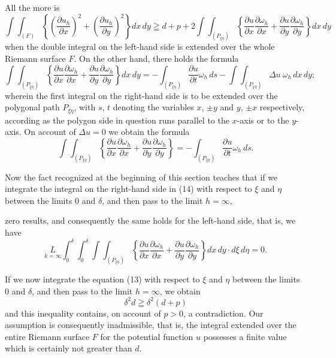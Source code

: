 \documentclass{article}
\begin{document}
All the more is
\[
\tag{13}
\int\!\!\int_{(F)} \left\{ \left(\frac{\partial u_h}{\partial x}\right)^2 + \left(\frac{\partial u_h}{\partial y}\right)^2 \right\} dx\,dy \geqq d + p + 2 \int\!\!\int_{(P_{\xi\eta})} \left\{ \frac{\partial u}{\partial x} \frac{\partial \omega_h}{\partial x} + \frac{\partial u}{\partial y} \frac{\partial \omega_h}{\partial y} \right\} dx\,dy
\]
when the double integral on the left-hand side is extended over the whole Riemann surface $F$. On the other hand, there holds the formula
\[
\int\!\!\int_{(P_{\xi\eta})} \left\{ \frac{\partial u}{\partial x} \frac{\partial \omega_h}{\partial x} + \frac{\partial u}{\partial y} \frac{\partial \omega_h}{\partial y} \right\} dx\,dy = - \int_{(P_{\xi\eta})} \frac{\partial u}{\partial t} \omega_h\,ds - \int\!\!\int_{(P_{\xi\eta})} \Delta u\ \omega_h\,dx\,dy;
\]
wherein the first integral on the right-hand side is to be extended over the polygonal path $P_{\xi\eta}$, with $s$, $t$ denoting the variables $x$, $\pm y$ and $y$, $\pm x$ respectively, according as the polygon side in question runs parallel to the $x$-axis or to the $y$-axis. On account of $\Delta u = 0$ we obtain the formula
\[
\tag{14}
\int\!\!\int_{(P_{\xi\eta})} \left\{ \frac{\partial u}{\partial x} \frac{\partial \omega_h}{\partial x} + \frac{\partial u}{\partial y} \frac{\partial \omega_h}{\partial y} \right\} = - \int_{(P_{\xi\eta})} \frac{\partial u}{\partial t} \omega_h\,ds.
\]

Now the fact recognized at the beginning of this section teaches that if we integrate the integral on the right-hand side in (14) with respect to $\xi$ and $\eta$ between the limits 0 and $\delta$, and then pass to the limit $h = \infty$,

zero results, and consequently the same holds for the left-hand side, that is, we have
\[
\underset{k=\infty}{L} \int_0^\delta \int_0^\delta \int\!\!\int_{(P_{\xi\eta})} \left\{ \frac{\partial u}{\partial x} \frac{\partial \omega_h}{\partial x} + \frac{\partial u}{\partial y} \frac{\partial \omega_h}{\partial y} \right\} dx\,dy \cdot d\xi\,d\eta = 0.
\]

If we now integrate the equation (13) with respect to $\xi$ and $\eta$ between the limits 0 and $\delta$, and then pass to the limit $h = \infty$, we obtain
\[
\delta^2 d \geqq \delta^2 (d + p)
\]
and this inequality contains, on account of $p > 0$, a contradiction. Our assumption is consequently inadmissible, that is, the integral extended over the entire Riemann surface $F$ for the potential function $u$ possesses a finite value which is certainly not greater than $d$.
\end{document}

